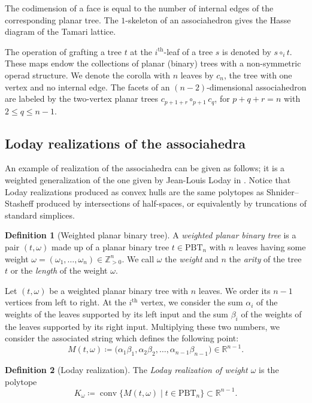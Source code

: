\documentclass[JEP,XML,SOM,Unicode,NoFloatCountersInSection]{cedram}
\theoremstyle{plain}
\theoremstyle{definition}
\newtheorem{definition}{Definition}
\newcommand{\RR}{\mathbb{R}}
\newcommand{\ZP}{\mathbb{Z}_{>0}}
\newcommand{\K}{{K}}
\newcommand{\Tam}[1]{\mathrm{PBT}_{#1}}
\DeclareMathOperator{\conv}{conv}
\begin{document}
The codimension of a face is equal to the number of internal edges of the corresponding planar tree.
The $1$-skeleton of an associahedron gives the Hasse diagram of the Tamari lattice.

The operation of grafting a tree $t$ at the $i^\text{th}$-leaf of a tree $s$ is denoted by $s\circ_i t$.
These maps endow the collections of planar (binary) trees with a non-symmetric operad structure.
We denote the corolla with $n$ leaves by $c_n$, \ie the tree with one vertex and no internal edge. The facets of an $(n-2)$-dimensional associahedron are labeled by
the two-vertex planar trees $c_{p+1+r} \circ_{p+1} c_q$, for $p+q+r=n$ with $2\leq q\leq n-1$.

\subsection{Loday realizations of the associahedra}

An example of realization of the associahedra can be given as follows; it is a weighted generalization of the one given by Jean-Louis Loday in \cite{Loday04a}. Notice that Loday realizations produced as convex hulls are the same polytopes as Shnider--Stasheff \cite{StasheffShnider97} produced by intersections of half-spaces, or equivalently by truncations of standard simplices.

\begin{definition}[Weighted planar binary tree]
A \emph{weighted planar binary tree} is a pair $(t, \omega)$ made up of a planar binary tree $t\in \Tam{n}$ with $n$ leaves having some weight $\omega= (\omega_1, \ldots, \omega_n) \in \ZP^n$. We call
$\omega$ the \emph{weight} and
$n$ the \emph{arity} of the tree $t$ or the \emph{length} of the weight $\omega$.
\end{definition}

Let $(t, \omega)$ be a weighted planar binary tree with $n$ leaves. We order its $n-1$ vertices from left to right. At the $i^\text{th}$ vertex, we consider the sum $\alpha_i$ of the weights of the leaves supported by its left input and
the sum $\beta_i$ of the weights of the leaves supported by its right input.
Multiplying these two numbers, we consider the associated string which defines the following point:\vspace*{-3pt}
\[M(t, \omega) \coloneqq \big(\alpha_1\beta_1, \alpha_2\beta_2, \ldots, \alpha_{n-1}\beta_{n-1}\big)\in \RR^{n-1}. \]

\begin{definition}[Loday realization]
The \emph{Loday realization of weight $\omega$} is the polytope\vspace*{-3pt}
\[\K_\omega \coloneqq \conv \big\{M(t, \omega)\mid t\in \Tam{n} \big\}\subset \RR^{n-1}.\]
\end{definition}
\end{document}
